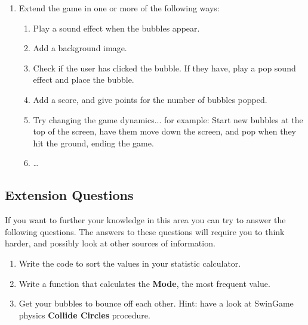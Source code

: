 \begin{enumerate}
\begin{enumerate}
    \item Extend the game in one or more of the following ways:
  
   \begin{enumerate}
    \item Play a sound effect when the bubbles appear.
    \item Add a background image.
    \item Check if the user has clicked the bubble. If they have, play a pop sound effect and place the bubble.
    \item Add a score, and give points for the number of bubbles popped.
    \item Try changing the game dynamics... for example: Start new bubbles at the top of the screen, have them move down the screen, and pop when they hit the ground, ending the game. 
    \item \ldots
   \end{enumerate}
  \end{enumerate}
  
\end{enumerate}

\clearpage
\subsection{Extension Questions} %
\label{sub:extension_questions_array}

If you want to further your knowledge in this area you can try to answer the following questions. The answers to these questions will require you to think harder, and possibly look at other sources of information.
\begin{enumerate}
  \item Write the code to sort the values in your statistic calculator.
  \item Write a function that calculates the \textbf{Mode}, the most frequent value.
  \item Get your bubbles to bounce off each other. Hint: have a look at SwinGame physics \textbf{Collide Circles} procedure.

  
  
  
\end{enumerate}